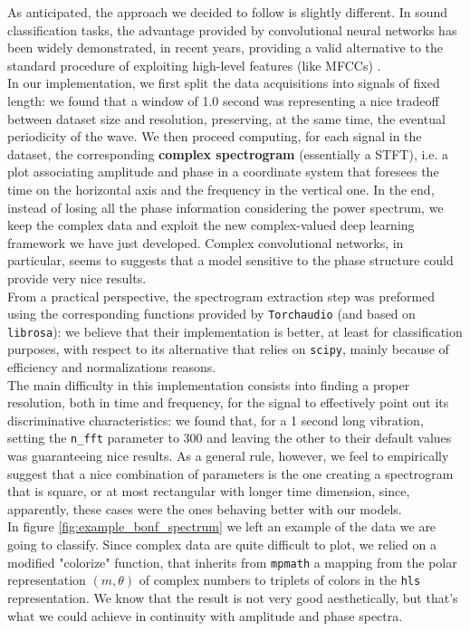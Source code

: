 \documentclass[../main.tex]{subfiles}
\begin{document}
As anticipated, the approach we decided to follow is slightly different. In sound classification tasks, the advantage provided by convolutional neural networks has been widely demonstrated, in recent years, providing a valid alternative to the standard procedure of exploiting high-level features (like MFCCs) \cite{}.\\
In our implementation, we first split the data acquisitions into signals of fixed length: we found that a window of 1.0 second was representing a nice tradeoff between dataset size and resolution, preserving, at the same time, the eventual periodicity of the wave. We then proceed computing, for each signal in the dataset, the corresponding \textbf{complex spectrogram} (essentially a STFT), i.e. a plot associating amplitude and phase in a coordinate system that foresees the time on the horizontal axis and the frequency in the vertical one. In the end, instead of losing all the phase information considering the power spectrum, we keep the complex data and exploit the new complex-valued deep learning framework we have just developed. Complex convolutional networks, in particular, seems to suggests that a model sensitive to the phase structure could provide very nice results.\\
From a practical perspective, the spectrogram extraction step was preformed using the corresponding functions provided by \texttt{Torchaudio} (and based on \texttt{librosa}): we believe that their implementation is better, at least for classification purposes, with respect to its alternative that relies on \texttt{scipy}, mainly because of efficiency and normalizations reasons.\\
The main difficulty in this implementation consists into finding a proper resolution, both in time and frequency, for the signal to effectively point out its discriminative characteristics: we found that, for a 1 second long vibration, setting the \texttt{n\_fft} parameter to 300 and leaving the other to their default values was guaranteeing nice results. As a general rule, however, we feel to empirically suggest that a nice combination of parameters is the one creating a spectrogram that is square, or at most rectangular with longer time dimension, since, apparently, these cases were the ones behaving better with our models.\\
In figure \ref{fig:example_bonf_spectrum} we left an example of the data we are going to classify. Since complex data are quite difficult to plot, we relied on a modified "colorize" function, that inherits from \texttt{mpmath} a mapping from the polar representation $(m, \theta)$ of complex numbers to triplets of colors in the \texttt{hls} representation. We know that the result is not very good aesthetically, but that's what we could achieve in continuity with amplitude and phase spectra.
\end{document}
